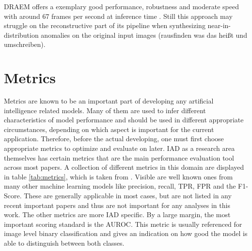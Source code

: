 DRAEM offers a exemplary good performance, robustness and moderate speed with around 67 frames per second at inference time \cite{liu2023simplenet}. Still this approach may struggle on the reconstructive 
part of its pipeline when synthesizing near-in-distribution anomalies on the original input images \cite{liu2024deep} (rausfinden was das heißt und umschreiben).










\section{Metrics}
\label{sec:metrics}
Metrics are known to be an important part of developing any artificial intelligence related models. Many of them are used to infer 
different characteristics of model performance and should be used in different appropriate circumstances, depending on which aspect 
is important for the current application. Therefore, before the actual developing, one must first choose appropriate metrics 
to optimize and evaluate on later. IAD as a research area themselves has certain metrics that are the main performance evaluation tool 
across most papers.\newline 
A collection of different metrics in this domain are displayed in table \ref{tab:metrics}, which is taken from 
\cite{liu2024deep}. Visible are well known 
ones from many other machine learning models like precision, recall, TPR, FPR and the F1-Score. These are generally applicable in most 
cases, but are not listed in any recent important papers and thus are not important for any analyses in this work. The other metrics are 
more IAD specific. By a large margin, the most important scoring standard is the AUROC. This metric is usually referenced for image level 
binary classification and gives an indication on how good the model is able to distinguish between both classes. 




